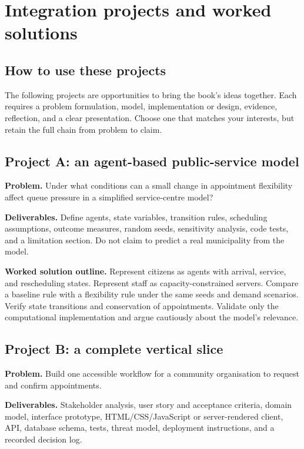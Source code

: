 \chapter{Integration projects and worked solutions}
\label{ch:integration-projects}

\section{How to use these projects}
The following projects are opportunities to bring the book's ideas together. Each requires a problem formulation, model, implementation or design, evidence, reflection, and a clear presentation. Choose one that matches your interests, but retain the full chain from problem to claim.

\section{Project A: an agent-based public-service model}
\textbf{Problem.} Under what conditions can a small change in appointment flexibility affect queue pressure in a simplified service-centre model?

\textbf{Deliverables.} Define agents, state variables, transition rules, scheduling assumptions, outcome measures, random seeds, sensitivity analysis, code tests, and a limitation section. Do not claim to predict a real municipality from the model.

\textbf{Worked solution outline.} Represent citizens as agents with arrival, service, and rescheduling states. Represent staff as capacity-constrained servers. Compare a baseline rule with a flexibility rule under the same seeds and demand scenarios. Verify state transitions and conservation of appointments. Validate only the computational implementation and argue cautiously about the model's relevance.

\section{Project B: a complete vertical slice}
\textbf{Problem.} Build one accessible workflow for a community organisation to request and confirm appointments.

\textbf{Deliverables.} Stakeholder analysis, user story and acceptance criteria, domain model, interface prototype, HTML/CSS/JavaScript or server-rendered client, API, database schema, tests, threat model, deployment instructions, and a recorded decision log.


